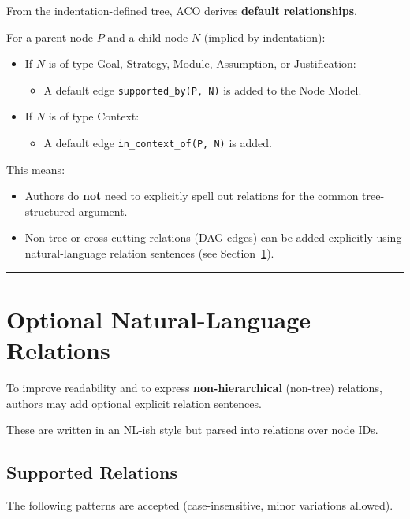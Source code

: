 \documentclass[11pt]{article}
\begin{document}
From the indentation-defined tree, ACO derives \textbf{default relationships}.

For a parent node \(P\) and a child node \(N\) (implied by indentation):
\begin{itemize}[leftmargin=2em]
  \item If \(N\) is of type Goal, Strategy, Module, Assumption, or Justification:
  \begin{itemize}[leftmargin=1.5em]
    \item A default edge \texttt{supported\_by(P, N)} is added to the Node Model.
  \end{itemize}

  \item If \(N\) is of type Context:
  \begin{itemize}[leftmargin=1.5em]
    \item A default edge \texttt{in\_context\_of(P, N)} is added.
  \end{itemize}
\end{itemize}

This means:
\begin{itemize}[leftmargin=2em]
  \item Authors do \textbf{not} need to explicitly spell out relations for the common tree-structured argument.
  \item Non-tree or cross-cutting relations (DAG edges) can be added explicitly using natural-language relation sentences (see Section~\ref{sec:nl-relations}).
\end{itemize}

\bigskip
\hrule
\bigskip

\section{Optional Natural-Language Relations}
\label{sec:nl-relations}

To improve readability and to express \textbf{non-hierarchical} (non-tree) relations, authors may add optional explicit relation sentences.

These are written in an NL-ish style but parsed into relations over node IDs.

\subsection{Supported Relations}

The following patterns are accepted (case-insensitive, minor variations allowed).
\end{document}
